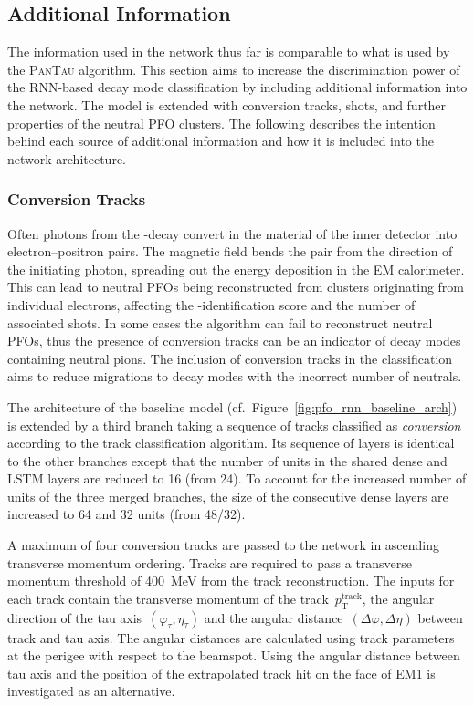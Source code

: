 \subsection{Additional Information}
\label{sec:add_info}
The information used in the network thus far is comparable to what is used by
the \textsc{PanTau} algorithm. This section aims to increase the discrimination
power of the RNN-based decay mode classification by including additional
information into the network. The model is extended with conversion tracks,
shots, and further properties of the neutral PFO clusters. The following
describes the intention behind each source of additional information and how it
is included into the network architecture.

\subsubsection{Conversion Tracks}
Often photons from the -decay convert in the material of the
inner detector into electron--positron pairs. The magnetic field bends the pair
from the direction of the initiating photon, spreading out the energy deposition
in the EM calorimeter. This can lead to neutral PFOs being reconstructed from
clusters originating from individual electrons, affecting the
-identification score and the number of associated shots. In some
cases the algorithm can fail to reconstruct neutral PFOs, thus the presence of
conversion tracks can be an indicator of decay modes containing neutral pions.
The inclusion of conversion tracks in the classification aims to reduce
migrations to decay modes with the incorrect number of neutrals.

The architecture of the baseline model (cf.\
Figure~\ref{fig:pfo_rnn_baseline_arch}) is extended by a third branch taking a
sequence of tracks classified as \emph{conversion} according to the track
classification algorithm. Its sequence of layers is identical to the other
branches except that the number of units in the shared dense and LSTM layers are
reduced to 16 (from 24). To account for the increased number of units of the
three merged branches, the size of the consecutive dense layers are increased to
64 and 32 units (from 48/32).

A maximum of four conversion tracks are passed to the network in ascending
transverse momentum ordering. Tracks are required to pass a transverse momentum
threshold of \SI{400}{\MeV} from the track reconstruction. The inputs for each
track contain the transverse momentum of the track~$p_\text{T}^\text{track}$,
the angular direction of the tau axis~$(\varphi_\tau, \eta_\tau)$ and the
angular distance~$(\Delta\varphi, \Delta\eta)$ between track and tau axis. The
angular distances are calculated using track parameters at the perigee with
respect to the beamspot. Using the angular distance between tau axis and the
position of the extrapolated track hit on the face of EM1 is investigated as an
alternative.

